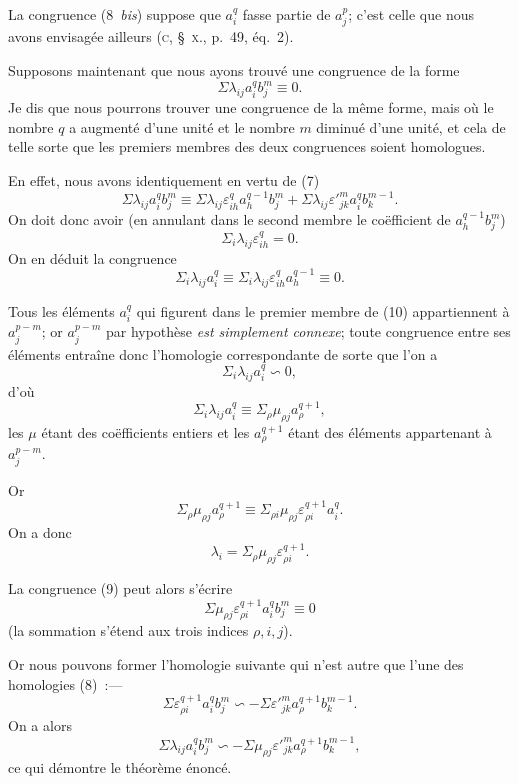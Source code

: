\documentclass{article}
\begin{document}
La congruence (8~\emph{bis}) suppose que $a^{q}_{i}$ fasse partie de $a^{p}_{j}$; c'est celle que nous avons envisagée ailleurs (\textsc{c}, \S~\textsc{x}., p.\ 49, éq.~2).

Supposons maintenant que nous ayons trouvé une congruence de la forme
\[ \Sigma \lambda_{ij} a^{q}_{i} b^{m}_{j} \equiv 0. \tag{9} \]
Je dis que nous pourrons trouver une congruence de la même forme, mais où le nombre $q$ a augmenté d'une unité et le nombre $m$ diminué d'une unité, et cela de telle sorte que les premiers membres des deux congruences soient homologues.

En effet, nous avons identiquement en vertu de (7)
\[ \Sigma \lambda_{ij} a^{q}_{i} b^{m}_{j} \equiv \Sigma \lambda_{ij} \varepsilon^{q}_{ih} a^{q-1}_{h} b^{m}_{j} + \Sigma \lambda_{ij} \varepsilon'^{m}_{jk} a^{q}_{i} b^{m-1}_{k}. \]
On doit donc avoir (en annulant dans le second membre le coëfficient de $a^{q-1}_{h} b^{m}_{j}$)
\[ \Sigma_{i} \lambda_{ij} \varepsilon^{q}_{ih} = 0. \]
On en déduit la congruence
\[ \Sigma_{i} \lambda_{ij} a^{q}_{i} \equiv \Sigma_{i} \lambda_{ij} \varepsilon^{q}_{ih} a^{q-1}_{h} \equiv 0. \tag{10} \]

Tous les éléments $a^{q}_{i}$ qui figurent dans le premier membre de (10) appartiennent à $a^{p-m}_{j}$; or $a^{p-m}_{j}$ par hypothèse \emph{est simplement connexe}; toute congruence entre ses éléments entraîne donc l'homologie correspondante de sorte que l'on a
\[ \Sigma_{i} \lambda_{ij} a^{q}_{i} \backsim 0, \]
d'où
\[ \Sigma_{i} \lambda_{ij} a^{q}_{i} \equiv \Sigma_{\rho} \mu_{\rho j} a^{q+1}_{\rho}, \]
les $\mu$ étant des coëfficients entiers et les $a^{q+1}_{\rho}$ étant des éléments appartenant à $a^{p-m}_{j}$.

Or
\[ \Sigma_{\rho} \mu_{\rho j} a^{q+1}_{\rho} \equiv \Sigma_{\rho i} \mu_{\rho j} \varepsilon^{q+1}_{\rho i} a^{q}_{i}. \]
On a donc
\[ \lambda_{i} = \Sigma_{\rho} \mu_{\rho j} \varepsilon^{q+1}_{\rho i}. \]

La congruence (9) peut alors s'écrire
\[ \Sigma \mu_{\rho j} \varepsilon^{q+1}_{\rho i} a^{q}_{i} b^{m}_{j} \equiv 0 \]
(la sommation s'étend aux trois indices $\rho, i, j$).

Or nous pouvons former l'homologie suivante qui n'est autre que l'une des homologies (8)~:---
\[ \Sigma \varepsilon^{q+1}_{\rho i} a^{q}_{i} b^{m}_{j} \backsim -\Sigma \varepsilon'^{m}_{jk} a^{q+1}_{\rho} b^{m-1}_{k}. \tag{11} \]
On a alors
\[ \Sigma \lambda_{ij} a^{q}_{i} b^{m}_{j} \backsim -\Sigma \mu_{\rho j} \varepsilon'^{m}_{jk} a^{q+1}_{\rho} b^{m-1}_{k}, \]
ce qui démontre le théorème énoncé.
\end{document}
